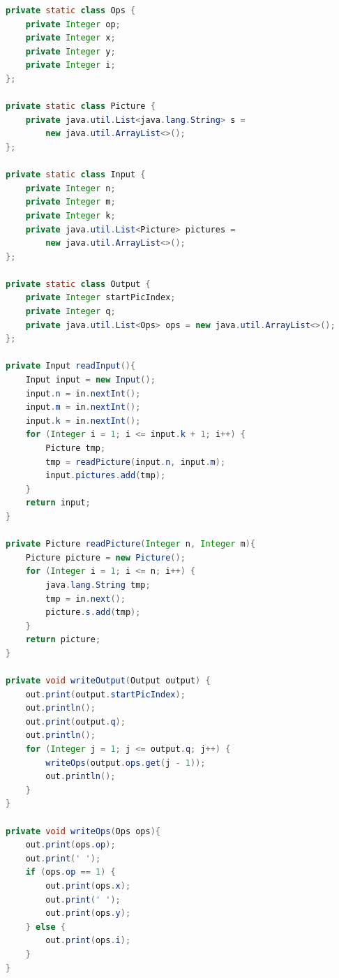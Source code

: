 \documentclass[times,specification,annotation]{style/itmo-student-thesis/itmo-student-thesis}
\begin{document}
\begin{lstlisting}[caption={Часть сгенерированного кода грейдера на языке Java},label={gen-grader-java},language=Java]
private static class Ops {
    private Integer op;
    private Integer x;
    private Integer y;
    private Integer i;
};
    
private static class Picture {
    private java.util.List<java.lang.String> s =
        new java.util.ArrayList<>();
};
    
private static class Input {
    private Integer n;
    private Integer m;
    private Integer k;
    private java.util.List<Picture> pictures =
        new java.util.ArrayList<>();
};
    
private static class Output {
    private Integer startPicIndex;
    private Integer q;
    private java.util.List<Ops> ops = new java.util.ArrayList<>();
};

private Input readInput(){
    Input input = new Input();
    input.n = in.nextInt();
    input.m = in.nextInt();
    input.k = in.nextInt();
    for (Integer i = 1; i <= input.k + 1; i++) {
        Picture tmp;
        tmp = readPicture(input.n, input.m);
        input.pictures.add(tmp);
    }
    return input;
}

private Picture readPicture(Integer n, Integer m){
    Picture picture = new Picture();
    for (Integer i = 1; i <= n; i++) {
        java.lang.String tmp;
        tmp = in.next();
        picture.s.add(tmp);
    }
    return picture;
}
    
private void writeOutput(Output output) {
    out.print(output.startPicIndex);
    out.println();
    out.print(output.q);
    out.println();
    for (Integer j = 1; j <= output.q; j++) {
        writeOps(output.ops.get(j - 1));
        out.println();
    }
}

private void writeOps(Ops ops){
    out.print(ops.op);
    out.print(' ');
    if (ops.op == 1) {
        out.print(ops.x);
        out.print(' ');
        out.print(ops.y);
    } else {
        out.print(ops.i);
    }
}
\end{lstlisting}
\end{document}
